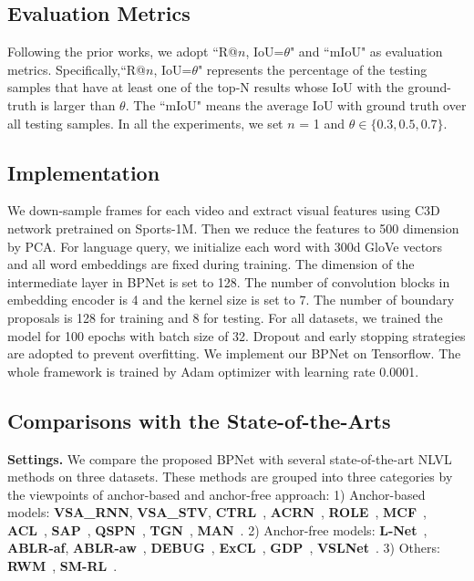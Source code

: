 \documentclass[letterpaper]{article} %
\begin{document}
\subsection{Evaluation Metrics}\label{Metrics}
Following the prior works, we adopt ``R@$n$, IoU=$\theta$" and ``mIoU" as evaluation metrics.
Specifically,``R@$n$, IoU=$\theta$" represents the percentage of the testing samples that
have at least one of the top-N results whose IoU with the ground-truth is larger than $\theta$.
The ``mIoU" means the average IoU with ground truth over all testing samples.
In all the experiments, we set $n$ = 1 and $\theta\in \{0.3, 0.5, 0.7\}$.

\subsection{Implementation}\label{Implementation}
We down-sample frames for each video and extract visual features
using C3D~\cite{DBLP:conf/iccv/TranBFTP15} network pretrained on Sports-1M. Then we reduce the features
to 500 dimension by PCA.
For language query, we initialize each word with 300d GloVe vectors and all word embeddings are fixed during training.
The dimension of the intermediate layer in BPNet is set to 128.
The number of convolution blocks in embedding encoder is 4 and the kernel size is set to 7.
The number of boundary proposals is 128 for training and 8 for testing.
For all datasets, we trained the model for 100 epochs with
batch size of 32.
Dropout and early stopping strategies are adopted to prevent overfitting.
We implement our BPNet on Tensorflow.
The whole framework is trained by Adam optimizer with learning rate 0.0001.

\subsection{Comparisons with the State-of-the-Arts}\label{Comparison}
\noindent\textbf{Settings.} We compare the proposed BPNet with several state-of-the-art NLVL methods on three datasets. These methods are grouped into three categories by the viewpoints of anchor-based and anchor-free approach:
 1) Anchor-based models:
\textbf{VSA\_RNN}, \textbf{VSA\_STV}, \textbf{CTRL}~\cite{DBLP:conf/iccv/GaoSYN17}, \textbf{ACRN}~\cite{DBLP:conf/sigir/LiuWN0CC18}, \textbf{ROLE}~\cite{DBLP:conf/mm/LiuWN0CC18}, \textbf{MCF}~\cite{DBLP:conf/ijcai/WuH18}, \textbf{ACL}~\cite{DBLP:conf/wacv/GeGCN19}, \textbf{SAP}~\cite{DBLP:conf/aaai/ChenJ19a},
\textbf{QSPN}~\cite{DBLP:conf/aaai/Xu0PSSS19},
\textbf{TGN}~\cite{ChenCMJC18},
\textbf{MAN}~\cite{DBLP:conf/cvpr/ZhangDWWD19}.
2) Anchor-free models:
\textbf{L-Net}~\cite{DBLP:conf/aaai/Chen0CJL19}, \textbf{ABLR-af}, \textbf{ABLR-aw}~\cite{DBLP:conf/aaai/YuanM019}, \textbf{DEBUG}~\cite{LuCTLX19},
\textbf{ExCL}~\cite{DBLP:conf/naacl/GhoshAPH19},
\textbf{GDP}~\cite{DBLP:conf/aaai/ChenLTXZTL20}, \textbf{VSLNet}~\cite{DBLP:conf/acl/ZhangSJZ20}.
3) Others:
\textbf{RWM}~\cite{DBLP:conf/aaai/HeZHLLW19}, \textbf{SM-RL}~\cite{DBLP:conf/cvpr/WangHW19}.
\end{document}
